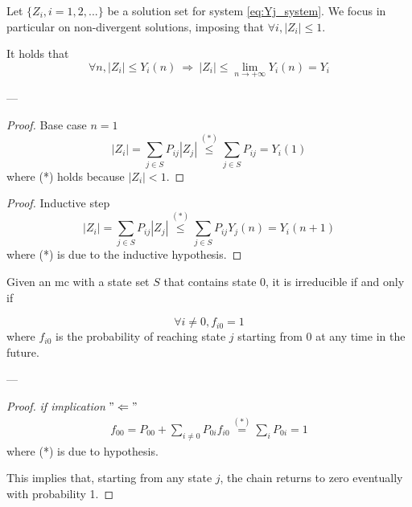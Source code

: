 	\begin{lemma}
		Let $\{Z_i, i=1, 2, ...\}$ be a solution set for system \ref{eq:Yj_system}. We focus in particular on non-divergent solutions, imposing that $ \forall i, |Z_i| \le 1 $.

		It holds that
		$$ \forall n, |Z_i| \le Y_i(n) ~ \Rightarrow ~|Z_i| \le \lim_{n \to +\infty} Y_i(n) = Y_i $$
	\end{lemma}
	---
	\begin{proof} Base case $n=1$
		$$ |Z_i| = \sum_{j \in S} P_{ij} |Z_j| \stackrel{(*)}{\le} \sum_{j \in S} P_{ij} = Y_i(1) $$
		where (*) holds because $|Z_i| < 1$.
	\end{proof}

	\begin{proof} Inductive step
		$$ |Z_i| = \sum_{j \in S} P_{ij} |Z_j| \stackrel{(*)}{\le} \sum_{j \in S} P_{ij} Y_j(n) = Y_i(n+1) $$
		where (*) is due to the inductive hypothesis.
	\end{proof}

	\begin{lemma}[4.13 (Ross 2, pg. 78-82)] \label{lemma:MC_irreducible_fi0}
		Given an \gls{mc} with a state set $S$ that contains state 0, it is irreducible if and only if

		$$ \forall i \neq 0, f_{i 0} = 1 $$
		where $f_{i 0}$ is the probability of reaching state $j$ starting from 0 at any time in the future.
	\end{lemma}
	---
	\begin{proof} \emph{if implication} $"\Leftarrow"$
		\begin{equation}\begin{split}
			f_{00} = P_{00} + \sum_{i \neq 0} P_{0i} f_{i 0} \stackrel{(*)}{=} \sum_{i} P_{0i} = 1
		\end{split}\end{equation}
		where (*) is due to hypothesis.

		This implies that, starting from any state $j$, the chain returns to zero eventually with probability 1.
	\end{proof}

